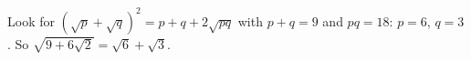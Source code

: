 Look for $\left(\sqrt p+\sqrt q\right)^2=p+q+2\sqrt{pq}$ with $p+q=9$ and $pq=18$: $p=6$, $q=3$. So $\sqrt{9+6\sqrt2}=\boxed{\sqrt6+\sqrt3}$.

